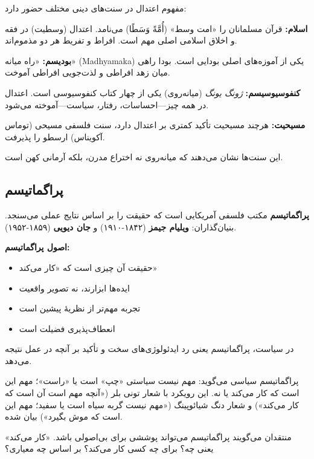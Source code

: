 مفهوم اعتدال در سنت‌های دینی مختلف حضور دارد:

\textbf{اسلام:}
قرآن مسلمانان را «امت وسط» (أُمَّةً وَسَطًا) می‌نامد. اعتدال (وسطیت) در فقه و اخلاق اسلامی اصلی مهم است. افراط و تفریط هر دو مذموم‌اند.

\textbf{بودیسم:}
«راه میانه» (Madhyamaka) یکی از آموزه‌های اصلی بودایی است. بودا راهی میان زهد افراطی و لذت‌جویی افراطی آموخت.

\textbf{کنفوسیوسیسم:}
\textit{ژونگ یونگ} (میانه‌روی) یکی از چهار کتاب کنفوسیوسی است. اعتدال در همه چیز—احساسات، رفتار، سیاست—آموخته می‌شود.

\textbf{مسیحیت:}
هرچند مسیحیت تأکید کمتری بر اعتدال دارد، سنت فلسفی مسیحی (توماس آکویناس) ارسطو را پذیرفت.

این سنت‌ها نشان می‌دهند که میانه‌روی نه اختراع مدرن، بلکه آرمانی کهن است.


\subsection{پراگماتیسم}

\begin{tcolorbox}[
    enhanced,
    colback=rightblue!8,
    colframe=rightblue,
    boxrule=1.5pt,
    arc=5pt,
    fonttitle=\bfseries,
    title={\rl{🔵 مفهوم کلیدی: پراگماتیسم}}
]
\textbf{پراگماتیسم} مکتب فلسفی آمریکایی است که حقیقت را بر اساس نتایج عملی می‌سنجد. بنیان‌گذاران: \textbf{ویلیام جیمز} (۱۸۴۲-۱۹۱۰) و \textbf{جان دیویی} (۱۸۵۹-۱۹۵۲).

\textbf{اصول پراگماتیسم:}
\begin{itemize}
    \item حقیقت آن چیزی است که «کار می‌کند»
    \item ایده‌ها ابزارند، نه تصویر واقعیت
    \item تجربه مهم‌تر از نظریهٔ پیشین است
    \item انعطاف‌پذیری فضیلت است
\end{itemize}

در سیاست، پراگماتیسم یعنی رد ایدئولوژی‌های سخت و تأکید بر آنچه در عمل نتیجه می‌دهد.
\end{tcolorbox}


پراگماتیسم سیاسی می‌گوید: مهم نیست سیاستی «چپ» است یا «راست»؛ مهم این است که کار می‌کند یا نه. این رویکرد با شعار تونی بلر («آنچه مهم است آن است که کار می‌کند») و شعار دنگ شیائوپینگ («مهم نیست گربه سیاه است یا سفید؛ مهم این است که موش بگیرد») بیان شده.

منتقدان می‌گویند پراگماتیسم می‌تواند پوششی برای بی‌اصولی باشد. «کار می‌کند» یعنی چه؟ برای چه کسی کار می‌کند؟ بر اساس چه معیاری؟

